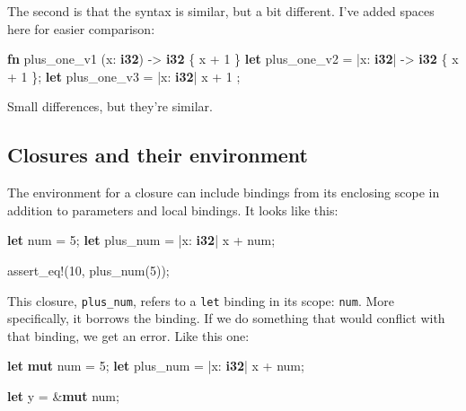 \documentclass[a4paper,]{book}
\newenvironment{Shaded}{\begin{snugshade}}{\end{snugshade}}
\newcommand{\KeywordTok}[1]{\textcolor[rgb]{0.13,0.29,0.53}{\textbf{{#1}}}}
\newcommand{\DecValTok}[1]{\textcolor[rgb]{0.00,0.00,0.81}{{#1}}}
\newcommand{\OtherTok}[1]{\textcolor[rgb]{0.56,0.35,0.01}{{#1}}}
\newcommand{\NormalTok}[1]{{#1}}
\begin{document}
The second is that the syntax is similar, but a bit different. I've
added spaces here for easier comparison:

\begin{Shaded}
\begin{Highlighting}[]
\KeywordTok{fn}  \NormalTok{plus_one_v1   (x: }\KeywordTok{i32}\NormalTok{) -> }\KeywordTok{i32} \NormalTok{\{ x + }\DecValTok{1} \NormalTok{\}}
\KeywordTok{let} \NormalTok{plus_one_v2 = |x: }\KeywordTok{i32}\NormalTok{| -> }\KeywordTok{i32} \NormalTok{\{ x + }\DecValTok{1} \NormalTok{\};}
\KeywordTok{let} \NormalTok{plus_one_v3 = |x: }\KeywordTok{i32}\NormalTok{|          x + }\DecValTok{1}  \NormalTok{;}
\end{Highlighting}
\end{Shaded}

Small differences, but they're similar.

\subsection{Closures and their
environment}\label{closures-and-their-environment}

The environment for a closure can include bindings from its enclosing
scope in addition to parameters and local bindings. It looks like this:

\begin{Shaded}
\begin{Highlighting}[]
\KeywordTok{let} \NormalTok{num = }\DecValTok{5}\NormalTok{;}
\KeywordTok{let} \NormalTok{plus_num = |x: }\KeywordTok{i32}\NormalTok{| x + num;}

\OtherTok{assert_eq!}\NormalTok{(}\DecValTok{10}\NormalTok{, plus_num(}\DecValTok{5}\NormalTok{));}
\end{Highlighting}
\end{Shaded}

This closure, \texttt{plus\_num}, refers to a \texttt{let} binding in
its scope: \texttt{num}. More specifically, it borrows the binding. If
we do something that would conflict with that binding, we get an error.
Like this one:

\begin{Shaded}
\begin{Highlighting}[]
\KeywordTok{let} \KeywordTok{mut} \NormalTok{num = }\DecValTok{5}\NormalTok{;}
\KeywordTok{let} \NormalTok{plus_num = |x: }\KeywordTok{i32}\NormalTok{| x + num;}

\KeywordTok{let} \NormalTok{y = &}\KeywordTok{mut} \NormalTok{num;}
\end{Highlighting}
\end{Shaded}
\end{document}
